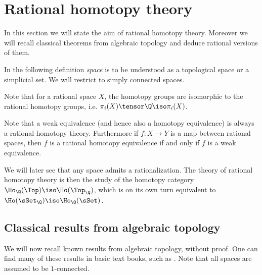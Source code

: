 
\section{Rational homotopy theory}
\label{sec:basics}

In this section we will state the aim of rational homotopy theory. Moreover we will recall classical theorems from algebraic topology and deduce rational versions of them.

In the following definition \emph{space} is to be understood as a topological space or a simplicial set. We will restrict to simply connected spaces.



Note that for a rational space $X$, the homotopy groups are isomorphic to the rational homotopy groups, i.e. $\pi_i(X) \tensor \Q \iso \pi_i(X)$.



Note that a weak equivalence (and hence also a homotopy equivalence) is always a rational homotopy theory. Furthermore if $f: X \to Y$ is a map between rational spaces, then $f$ is a rational homotopy equivalence if and only if $f$ is a weak equivalence.

We will later see that any space admits a rationalization. The theory of rational homotopy theory is then the study of the homotopy category $\Ho_\Q(\Top) \iso \Ho(\Top_\Q)$, which is on its own turn equivalent to $\Ho(\sSet_\Q) \iso \Ho_\Q(\sSet)$.

\subsection{Classical results from algebraic topology}

We will now recall known results from algebraic topology, without proof. One can find many of these results in basic text books, such as \cite{may, dold}. Note that all spaces are assumed to be $1$-connected.

